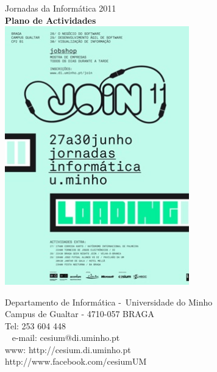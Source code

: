 \begin{titlepage}
	\begin{center}
		\vspace*{\fill}
		\Huge{Jornadas da Informática 2011}\\
		\vspace{20pt}
		\Huge\textbf{Plano de Actividades}\\
		\vspace{10pt}
		\includegraphics[width=0.6\textwidth]{material/cartaz}\\

		\vspace*{\fill}
	\end{center}

	\begin{flushright}
		Departamento de Informática - Universidade do Minho\\
        Campus de Gualtar - 4710-057 BRAGA\\
        Tel: 253 604 448\\ 
        e-mail: cesium@di.uminho.pt\\
        www: http://cesium.di.uminho.pt\\
        http://www.facebook.com/cesiumUM
	\end{flushright}
\end{titlepage}
